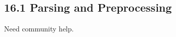 \documentclass[../../main.tex]{subfiles}
\begin{document}
\subsection{16.1 Parsing and Preprocessing}

Need community help.
\end{document}
